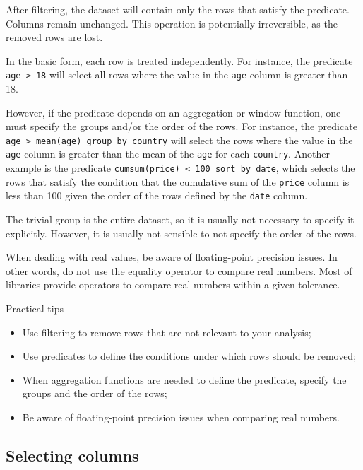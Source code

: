 After filtering, the dataset will contain only the rows that satisfy the predicate.
Columns remain unchanged.  This operation is potentially irreversible, as the removed
rows are lost.

In the basic form, each row is treated independently.  For instance, the predicate
\texttt{age > 18} will select all rows where the value in the \texttt{age} column is
greater than 18.

However, if the predicate depends on an aggregation or window function, one must specify
the groups and/or the order of the rows.  For instance, the predicate \texttt{age >
mean(age) group by country} will select the rows where the value in the \texttt{age}
column is greater than the mean of the \texttt{age} for each \texttt{country}. Another
example is the predicate \texttt{cumsum(price) < 100 sort by date}, which selects the rows
that satisfy the condition that the cumulative sum of the \texttt{price} column is less
than 100 given the order of the rows defined by the \texttt{date} column.

The trivial group is the entire dataset, so it is usually not necessary to specify it
explicitly.  However, it is usually not sensible to not specify the order of the rows.

When dealing with real values, be aware of floating-point precision issues.  In other
words, do not use the equality operator to compare real numbers.  Most of libraries
provide operators to compare real numbers within a given tolerance.

\begin{hlbox}{Practical tips}
  \begin{itemize}
    \item Use filtering to remove rows that are not relevant to your analysis;
    \item Use predicates to define the conditions under which rows should be removed;
    \item When aggregation functions are needed to define the predicate, specify the groups and
      the order of the rows;
    \item Be aware of floating-point precision issues when comparing real numbers.
  \end{itemize}
\end{hlbox}

\subsection{Selecting columns}

